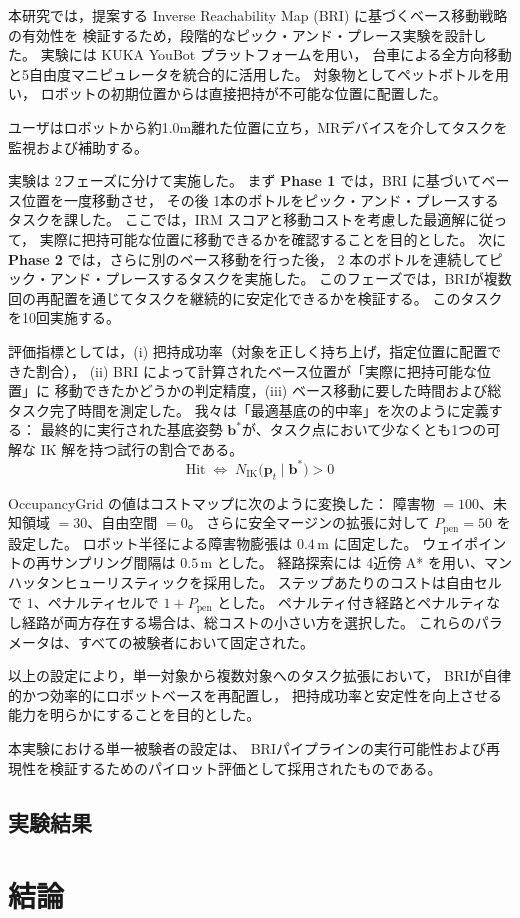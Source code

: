 \documentclass[../../main.tex]{subfiles} %
\begin{document}
本研究では，提案する Inverse Reachability Map (BRI) に基づくベース移動戦略の有効性を
検証するため，段階的なピック・アンド・プレース実験を設計した。
実験には KUKA YouBot プラットフォームを用い，
台車による全方向移動と5自由度マニピュレータを統合的に活用した。
対象物としてペットボトルを用い，
ロボットの初期位置からは直接把持が不可能な位置に配置した。

ユーザはロボットから約1.0m離れた位置に立ち，MRデバイスを介してタスクを監視および補助する。

実験は 2フェーズに分けて実施した。
まず \textbf{Phase 1} では，BRI に基づいてベース位置を一度移動させ，
その後 1本のボトルをピック・アンド・プレースするタスクを課した。
ここでは，IRM スコアと移動コストを考慮した最適解に従って，
実際に把持可能な位置に移動できるかを確認することを目的とした。
次に \textbf{Phase 2} では，さらに別のベース移動を行った後，
2 本のボトルを連続してピック・アンド・プレースするタスクを実施した。
このフェーズでは，BRIが複数回の再配置を通じてタスクを継続的に安定化できるかを検証する。
このタスクを10回実施する。


評価指標としては，(i) 把持成功率（対象を正しく持ち上げ，指定位置に配置できた割合），
(ii) BRI によって計算されたベース位置が「実際に把持可能な位置」に
移動できたかどうかの判定精度，(iii) ベース移動に要した時間および総タスク完了時間を測定した。
我々は「最適基底の的中率」を次のように定義する：
最終的に実行された基底姿勢 $\mathbf{b}^{*}$が、タスク点において少なくとも1つの可解な IK 解を持つ試行の割合である。
\[
\mathrm{Hit}\;\Leftrightarrow\; N_{\mathrm{IK}}\bigl(\mathbf{p}_t \mid \mathbf{b}^{\ast}\bigr) > 0
\]


OccupancyGrid の値はコストマップに次のように変換した：
障害物 $=100$、未知領域 $=30$、自由空間 $=0$。
さらに安全マージンの拡張に対して $P_{\text{pen}}=50$ を設定した。
ロボット半径による障害物膨張は $0.4\,\mathrm{m}$ に固定した。
ウェイポイントの再サンプリング間隔は $0.5\,\mathrm{m}$ とした。
経路探索には 4近傍 A* を用い、マンハッタンヒューリスティックを採用した。
ステップあたりのコストは自由セルで $1$、ペナルティセルで $1+P_{\text{pen}}$ とした。
ペナルティ付き経路とペナルティなし経路が両方存在する場合は、総コストの小さい方を選択した。
これらのパラメータは、すべての被験者において固定された。

以上の設定により，単一対象から複数対象へのタスク拡張において，
BRIが自律的かつ効率的にロボットベースを再配置し，
把持成功率と安定性を向上させる能力を明らかにすることを目的とした。

本実験における単一被験者の設定は、
BRIパイプラインの実行可能性および再現性を検証するためのパイロット評価として採用されたものである。
\subsection{実験結果}



\section{結論}
\end{document}
